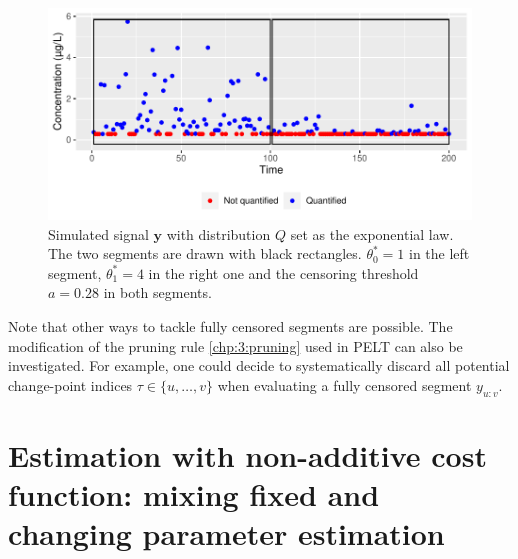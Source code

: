 \begin{figure}[ht]
    \centering
    \includegraphics{figs/Chap4/theta_max_ex.pdf}
    \caption{Simulated signal $\bm y$ with distribution $Q$ set as the exponential law. \\
    The two segments are drawn with black rectangles. $\theta^*_0 = 1$ in the left segment, $\theta^*_1 = 4$ in the right one and the censoring threshold $a = 0.28$ in both segments.}
    \label{fig:theta_max}
\end{figure}

Note that other ways to tackle fully censored segments are possible. The modification of the pruning rule \eqref{chp:3:pruning} used in PELT can also be investigated. For example, one could decide to systematically discard all potential change-point indices $\tau \in \{u,\dots,v\}$ when evaluating a fully censored segment $y_{u:v}$.  

\section{Estimation with non-additive cost function: mixing fixed and changing parameter estimation}\label{chp:4:3}



